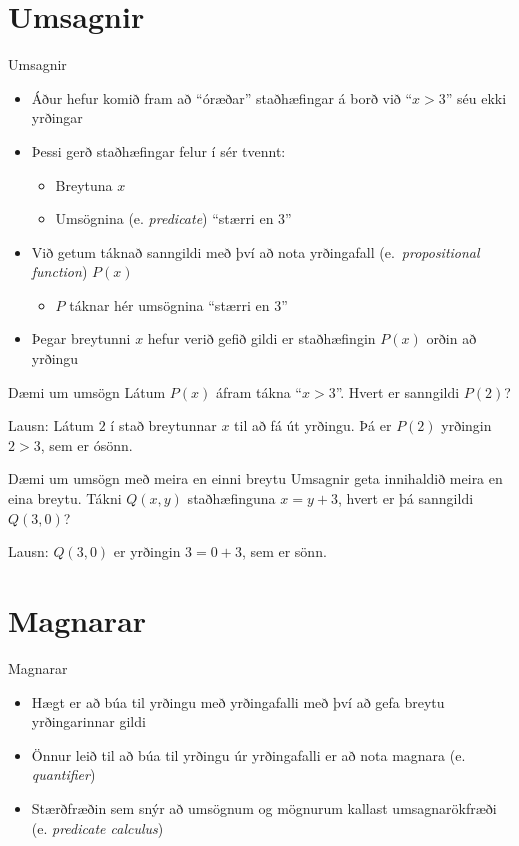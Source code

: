 \documentclass{beamer}
\begin{document}
\section{Umsagnir}

\begin{frame}{Umsagnir}
\begin{itemize}
 \item Áður hefur komið fram að ``óræðar'' staðhæfingar á borð við ``$x > 3$'' séu ekki yrðingar
 \item Þessi gerð staðhæfingar felur í sér tvennt:
 \begin{itemize}
  \item Breytuna $x$
  \item Umsögnina (e. \emph{predicate}) ``stærri en 3''
 \end{itemize}
 \item Við getum táknað sanngildi með því að nota yrðingafall (e.\ \emph{propositional function}) $P(x)$
 \begin{itemize}
  \item $P$ táknar hér umsögnina ``stærri en 3''
 \end{itemize}
 \item Þegar breytunni $x$ hefur verið gefið gildi er staðhæfingin $P(x)$ orðin að yrðingu
\end{itemize}
\end{frame}

\begin{frame}{Dæmi um umsögn}
Látum $P(x)$ áfram tákna ``$x > 3$''. Hvert er sanngildi $P(2)$? \pause

\vspace{0.5cm}
Lausn: Látum $2$ í stað breytunnar $x$ til að fá út yrðingu. Þá er $P(2)$ yrðingin $2 > 3$, sem er ósönn.
\end{frame}

\begin{frame}{Dæmi um umsögn með meira en einni breytu}
Umsagnir geta innihaldið meira en eina breytu. Tákni $Q(x, y)$ staðhæfinguna $x = y + 3$, hvert er þá sanngildi $Q(3, 0)$? \pause
\vspace{0.5cm}

Lausn: $Q(3, 0)$ er yrðingin $3 = 0 + 3$, sem er sönn.
\end{frame}

\section{Magnarar}

\begin{frame}{Magnarar}
\begin{itemize}
 \item Hægt er að búa til yrðingu með yrðingafalli með því að gefa breytu yrðingarinnar gildi
 \item Önnur leið til að búa til yrðingu úr yrðingafalli er að nota magnara (e. \emph{quantifier})
 \item Stærðfræðin sem snýr að umsögnum og mögnurum kallast umsagnarökfræði (e. \emph{predicate calculus})
\end{itemize}
\end{frame}
\end{document}
